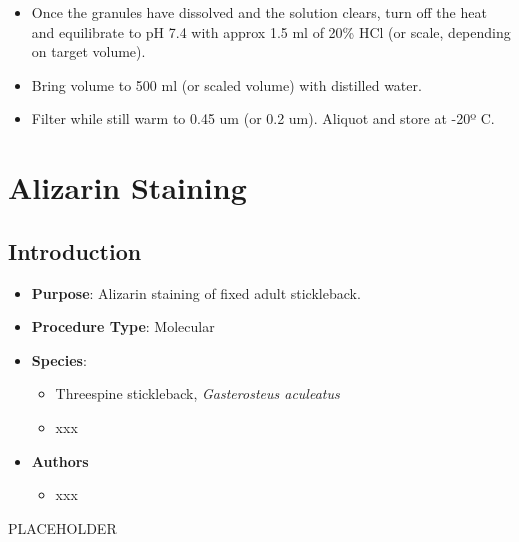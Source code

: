\documentclass[
  letterpaper,
  DIV=11,
  numbers=noendperiod]{scrreprt}
\providecommand{\tightlist}{%
  \setlength{\itemsep}{0pt}\setlength{\parskip}{0pt}}\usepackage{longtable,booktabs,array}
\begin{document}
\begin{itemize}
\item
  Once the granules have dissolved and the solution clears, turn off the
  heat and equilibrate to pH 7.4 with approx 1.5 ml of 20\% HCl (or
  scale, depending on target volume).
\item
  Bring volume to 500 ml (or scaled volume) with distilled water.
\item
  Filter while still warm to 0.45 um (or 0.2 um). Aliquot and store at
  -20º C.
\end{itemize}

\hypertarget{sec-molec-aliz}{%
\chapter{Alizarin Staining}\label{sec-molec-aliz}}

\hypertarget{introduction-4}{%
\section{Introduction}\label{introduction-4}}

\begin{itemize}
\tightlist
\item
  \textbf{Purpose}: Alizarin staining of fixed adult stickleback.
\item
  \textbf{Procedure Type}: Molecular
\item
  \textbf{Species}:

  \begin{itemize}
  \tightlist
  \item
    Threespine stickleback, \emph{Gasterosteus aculeatus}
  \item
    xxx
  \end{itemize}
\item
  \textbf{Authors}

  \begin{itemize}
  \tightlist
  \item
    xxx
  \end{itemize}
\end{itemize}

\begin{tcolorbox}[enhanced jigsaw, bottomtitle=1mm, rightrule=.15mm, toptitle=1mm, opacitybacktitle=0.6, bottomrule=.15mm, titlerule=0mm, coltitle=black, leftrule=.75mm, arc=.35mm, colback=white, colframe=quarto-callout-warning-color-frame, left=2mm, colbacktitle=quarto-callout-warning-color!10!white, title=\textcolor{quarto-callout-warning-color}{\faExclamationTriangle}\hspace{0.5em}{Schedule for Cleaning}, toprule=.15mm, opacityback=0, breakable]

PLACEHOLDER

\end{tcolorbox}
\end{document}
